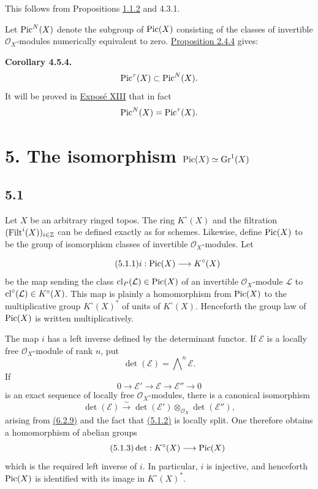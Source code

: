 This follows from Propositions \hyperlink{sga6.e10.prop.1-1-2}{1.1.2} and 4.3.1.

Let $\operatorname{Pic}^N(X)$ denote the subgroup of $\operatorname{Pic}(X)$ consisting of the classes of
invertible $\mathcal O_X$-modules numerically equivalent to zero.
\hyperlink{sga6.e10.prop.2-4-4}{Proposition 2.4.4} gives:

\textbf{Corollary 4.5.4.}
\[
\operatorname{Pic}^\tau(X)\subset\operatorname{Pic}^N(X).
\]
It will be proved in \hyperlink{sga6.e13.expose}{Expos\'e XIII} that in fact
\[
\operatorname{Pic}^N(X)=\operatorname{Pic}^\tau(X).
\]

\section*{5. The isomorphism $\operatorname{Pic}(X)\simeq\operatorname{Gr}^1(X)$}

\subsection*{5.1}
Let $X$ be an arbitrary ringed topos. The ring $K^\circ(X)$ and the
filtration $(\operatorname{Filt}^i(X))_{i\in\mathbb Z}$ can be defined exactly as for
schemes. Likewise, define $\operatorname{Pic}(X)$ to be the group of isomorphism classes of
invertible $\mathcal O_X$-modules. Let

\begin{equation}\tag{5.1.1}
i:\operatorname{Pic}(X)\longrightarrow K^\circ(X)
\end{equation}
be the map sending the class $\operatorname{cl}_P(\mathcal L)\in\operatorname{Pic}(X)$ of an invertible
$\mathcal O_X$-module $\mathcal L$ to
$\operatorname{cl}^\circ(\mathcal L)\in K^\circ(X)$. This map is plainly a homomorphism
from $\operatorname{Pic}(X)$ to the multiplicative group $K^\circ(X)^*$ of units of
$K^\circ(X)$. Henceforth the group law of $\operatorname{Pic}(X)$ is written
multiplicatively.

The map $i$ has a left inverse defined by the determinant functor. If
$\mathcal E$ is a locally free $\mathcal O_X$-module of rank $n$, put
\[
\det(\mathcal E)=\bigwedge\nolimits^n\mathcal E.
\]
If
\begin{equation}\tag{5.1.2}
0\longrightarrow\mathcal E'\longrightarrow\mathcal E
\longrightarrow\mathcal E''\longrightarrow0
\end{equation}
is an exact sequence of locally free $\mathcal O_X$-modules, there is a
canonical isomorphism
\[
\det(\mathcal E)\xrightarrow{\sim}
\det(\mathcal E')\otimes_{\mathcal O_X}\det(\mathcal E''),
\]
arising from \hyperlink{sga6.e10.eq.6-2-9}{(6.2.9)} and the fact that \hyperlink{sga6.e10.eq.5-1-2}{(5.1.2)} is locally split. One therefore
obtains a homomorphism of abelian groups
\begin{equation}\tag{5.1.3}
\det:K^\circ(X)\longrightarrow\operatorname{Pic}(X)
\end{equation}
which is the required left inverse of $i$. In particular, $i$ is injective,
and henceforth $\operatorname{Pic}(X)$ is identified with its image in $K^\circ(X)^*$.

